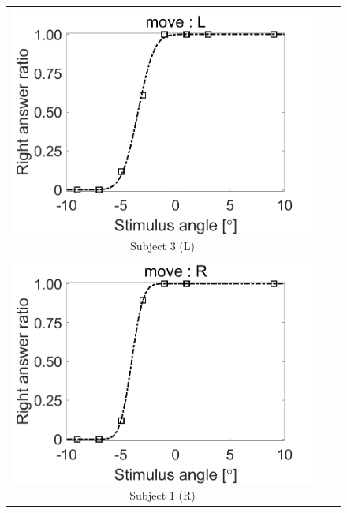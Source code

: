 \documentclass[12pt,a4j]{jsarticle}
\renewcommand{\ }{\hspace{1zw}}
\begin{document}
\begin{figure}[htbp]
\begin{tabular}{ccc}
\begin{minipage}{0.33\columnwidth}
            \centering
            \includegraphics[width=\columnwidth]{./figure/L_oikawa.png}
            Subject 3 (L)
        \end{minipage}\\
        \vspace{0.5cm}
        \begin{minipage}{0.33\columnwidth}
            \centering
            \includegraphics[width=\columnwidth]{./figure/R_maeda.png}
            Subject 1 (R)
        \end{minipage}
        \begin{minipage}{0.33\columnwidth}
            \centering

\end{minipage}
\end{tabular}
\end{figure}
\end{document}
